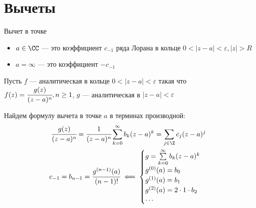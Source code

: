 \section{Вычеты}
\begin{df}
    Вычет в точке 
    \begin{itemize}
        \item $a \in \CC$ --- это коэффициент $c_{-1}$ ряда Лорана в кольце $0 < |z - a| < \varepsilon, |z| > R$
        \item $a = \infty$ --- это коэффициент $-c_{-1}$
    \end{itemize}
\end{df}
\begin{claim}
    Пусть $f$ --- аналитическая в кольце $0 < |z - a| < \varepsilon$ такая что \newline
    $f(z) = \cfrac{g(z)}{(z - a)^n}, n \geq 1$, $g$ --- аналитическая в $|z - a| < \varepsilon$

    Найдем формулу вычета в точке $a$ в терминах производной: 
    \begin{gather*}
        \cfrac{g(z)}{(z - a)^n} = \cfrac{1}{(z - a)^n}\sum\limits_{k = 0}^{\infty}b_k(z - a)^k = \sum\limits_{j \in \Z} c_j(z - a)^j \\ 
        c_{-1} = b_{n - 1} = \cfrac{g^{(n - 1)}(a)}{(n - 1)!} \impliedby \begin{cases}
            g = \sum\limits_{k = 0}^{\infty} b_k(z - a)^k \\ 
            g^{(0)}(a) = b_0 \\ 
            g^{(1)}(a) = b_1 \\ 
            g^{(2)}(a) = 2 \cdot 1 \cdot b_2 \\ 
            \cdots
        \end{cases}
    \end{gather*}
\end{claim}
